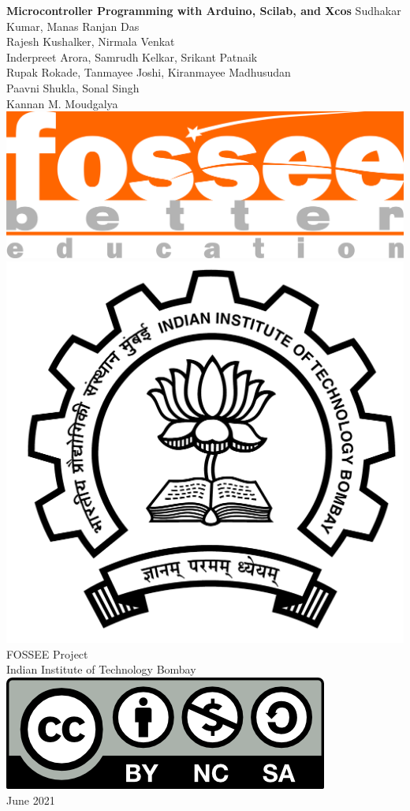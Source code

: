 \begin{center}
    {\bf {\Huge Microcontroller Programming with Arduino, Scilab, and Xcos}}
    \vfill
    Sudhakar Kumar, Manas Ranjan Das \\
    Rajesh Kushalker, Nirmala Venkat \\
    Inderpreet Arora, Samrudh Kelkar, Srikant Patnaik \\
    Rupak Rokade, Tanmayee Joshi, Kiranmayee Madhusudan \\
    Paavni Shukla, Sonal Singh \\
    Kannan M. Moudgalya \\
    \vfill
    \includegraphics[width=0.3\linewidth]{suppl/fossee_logo_hi.png} \quad
    \includegraphics[width=0.2\linewidth]{suppl/IITB-logo-HighRes.png} \\
    FOSSEE Project \\
    Indian Institute of Technology Bombay \\ [2mm]
    \includegraphics[width=0.15\linewidth]{suppl/by-nc-sa.png} \\ [1mm]
    June 2021
\end{center}

\clearpage
